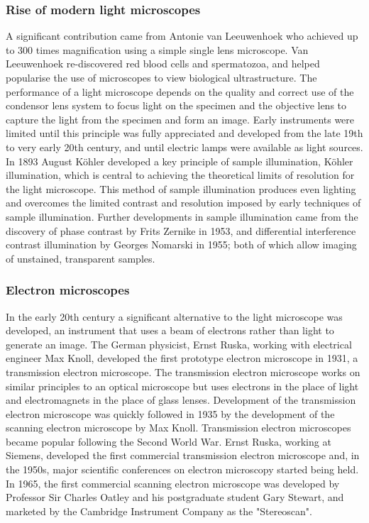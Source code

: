 \documentclass[12pt]{article}
\begin{document}
\subsubsection{Rise of modern light microscopes}
A significant contribution came from Antonie van Leeuwenhoek who achieved up to 300 times magnification using a simple single lens microscope.
Van Leeuwenhoek re-discovered red blood cells and spermatozoa, and helped popularise the use of microscopes to view biological ultrastructure.
The performance of a light microscope depends on the quality and correct use of the condensor lens system to focus light on the specimen and the objective lens to capture the light from the specimen and form an image.
Early instruments were limited until this principle was fully appreciated and developed from the late 19th to very early 20th century, and until electric lamps were available as light sources.
In 1893 August Köhler developed a key principle of sample illumination, Köhler illumination, which is central to achieving the theoretical limits of resolution for the light microscope.
This method of sample illumination produces even lighting and overcomes the limited contrast and resolution imposed by early techniques of sample illumination.
Further developments in sample illumination came from the discovery of phase contrast by Frits Zernike in 1953, and differential interference contrast illumination by Georges Nomarski in 1955; both of which allow imaging of unstained, transparent samples.

\subsubsection{Electron microscopes}
In the early 20th century a significant alternative to the light microscope was developed, an instrument that uses a beam of electrons rather than light to generate an image.
The German physicist, Ernst Ruska, working with electrical engineer Max Knoll, developed the first prototype electron microscope in 1931, a transmission electron microscope.
The transmission electron microscope works on similar principles to an optical microscope but uses electrons in the place of light and electromagnets in the place of glass lenses.
Development of the transmission electron microscope was quickly followed in 1935 by the development of the scanning electron microscope by Max Knoll.
Transmission electron microscopes became popular following the Second World War.
Ernst Ruska, working at Siemens, developed the first commercial transmission electron microscope and, in the 1950s, major scientific conferences on electron microscopy started being held.
In 1965, the first commercial scanning electron microscope was developed by Professor Sir Charles Oatley and his postgraduate student Gary Stewart, and marketed by the Cambridge Instrument Company as the "Stereoscan".
\end{document}
